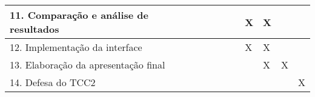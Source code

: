 \begin{quadro}[!htb]
\begin{tabular}{|p{4.5cm}|p{0.7cm}|p{0.7cm}|p{0.7cm}|p{0.7cm}|p{0.7cm}|p{0.7cm}|p{0.7cm}|p{0.7cm}|p{0.7cm}|p{0.7cm}|}
        \hline
        \small{11. Comparação e análise de resultados} 			     &  	             &              &  		   & 		  &  		 &   	        &  X	       & X 	      & 	     & 		     \\
        \hline
        \small{12. Implementação da interface} 				     &  	             &              &  		   & 		  &  		 &   	        &  X	       &  X	      & 	     & 		     \\
        \hline
        \small{13. Elaboração da apresentação final} 			     &  	             &              &  		   & 		  &  		 &   	        &   	       &  X	      &  X	     & 		     \\
        \hline        
        \small{14. Defesa do TCC2}					     &  	             &              &  		   & 		  &  		 &   	        &   	       &   	      & 	     & X	     \\
        \hline
    \end{tabular}
\end{quadro}

